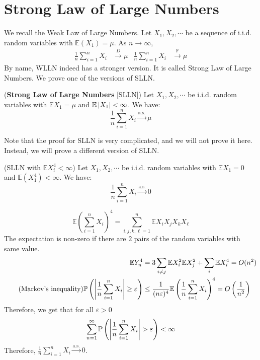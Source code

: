 \documentclass{huhtakm-template-book}
\newcommand{\prob}{\mathbb{P}}
\newcommand{\expect}{\mathbb{E}}
\begin{document}
\section{Strong Law of Large Numbers}
We recall the Weak Law of Large Numbers. Let $X_{1},X_{2},\cdots$ be a sequence of i.i.d. random variables with $\expect(X_{1})=\mu$. As $n\to\infty$,
\begin{align*}
	\frac{1}{n}\sum_{i=1}^{n}X_{i}&\xrightarrow{D}\mu & \frac{1}{n}\sum_{i=1}^{n}X_{i}&\xrightarrow{\prob}\mu
\end{align*}
By name, WLLN indeed has a stronger version. It is called Strong Law of Large Numbers. We prove one of the versions of SLLN.
\begin{thm}(\textbf{Strong Law of Large Numbers} [SLLN])
	Let $X_{1},X_{2},\cdots$ be i.i.d. random variables with $\expect X_{1}=\mu$ and $\expect\abs{X_{1}}<\infty$. We have:
	\begin{equation*}
		\frac{1}{n}\sum_{i=1}^{n}X_{i}\xrightarrow{\text{a.s.}}\mu
	\end{equation*}
\end{thm}
Note that the proof for SLLN is very complicated, and we will not prove it here. Instead, we will prove a different version of SLLN.
\newpage
\begin{thm}(SLLN with $\expect X_{i}^{4}<\infty$)
	Let $X_{1},X_{2},\cdots$ be i.i.d. random variables with $\expect X_{1}=0$ and $\expect(X_{1}^{4})<\infty$. We have:
	\begin{equation*}
		\frac{1}{n}\sum_{i=1}^{n}X_{i}\xrightarrow{\text{a.s.}}0
	\end{equation*}
\end{thm}
\begin{proofing}
	\begin{equation*}
		\expect\left(\sum_{i=1}^{n}X_{i}\right)^{4}=\sum_{i,j,k,\ell=1}^{n}\expect X_{i}X_{j}X_{k}X_{\ell}
	\end{equation*}
	The expectation is non-zero if there are $2$ pairs of the random variables with same value.
	\begin{align*}
		\expect Y_{n}^{4}&=3\sum_{i\neq j}\expect X_{i}^{2}\expect X_{j}^{2}+\sum_{i}\expect X_{i}^{4}=O(n^{2})\\
		\tag{Markov's inequality}
		\prob\left(\abs{\frac{1}{n}\sum_{i=1}^{n}X_{i}}\geq\varepsilon\right)&\leq\frac{1}{(n\varepsilon)^{4}}\expect\left(\frac{1}{n}\sum_{i=1}^{n}X_{i}\right)^{4}=O\left(\frac{1}{n^{2}}\right)
	\end{align*}
	Therefore, we get that for all $\varepsilon>0$
	\begin{equation*}
		\sum_{n=1}^{\infty}\prob\left(\abs{\frac{1}{n}\sum_{i=1}^{n}X_{i}}>\varepsilon\right)<\infty
	\end{equation*}
	Therefore, $\frac{1}{n}\sum_{i=1}^{n}X_{i}\xrightarrow{\text{a.s.}}0$.
\end{proofing}
\end{document}
